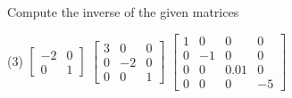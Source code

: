 \documentclass{ximera}
\begin{document}
\begin{exercise}
    Compute the inverse of the given matrices
    \begin{tasks}(3)
        \task
        $\begin{bmatrix}
            -2 & 0 \\
            0 & 1 
        \end{bmatrix}$
        \task
        $\begin{bmatrix}
            3 & 0 & 0 \\
            0 & -2 & 0 \\ 
            0 & 0 & 1
        \end{bmatrix}$
        \task
        $\begin{bmatrix}
            1 & 0 & 0 & 0 \\
            0 & -1 & 0 & 0 \\ 
            0 & 0 & 0.01 & 0 \\
            0 & 0 & 0 & -5
        \end{bmatrix}$
    \end{tasks}
\end{exercise}
\end{document}
